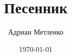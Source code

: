 \documentclass[14pt]{extreport}
\title{Песенник}
\author{Адриан Метленко}
\date{\today}
\begin{document}
\maketitle
\clearpage

\hypertarget{toc}{}
\tableofcontents
\clearpage
\pagestyle{fancy}



\clearpage
\hypertarget{artists}{}
\printindex[artists]
\end{document}

